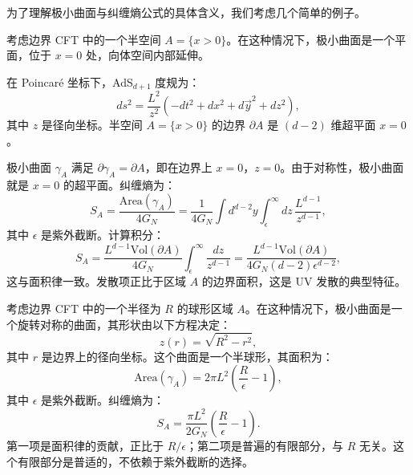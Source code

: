 为了理解极小曲面与纠缠熵公式的具体含义，我们考虑几个简单的例子。

\begin{example}[半空间的纠缠熵] \label{ex:halfspace}
考虑边界 CFT 中的一个半空间 $A = \{x > 0\}$。在这种情况下，极小曲面是一个平面，位于 $x = 0$ 处，向体空间内部延伸。

在 Poincaré 坐标下，AdS$_{d+1}$ 度规为：
\begin{equation}
    ds^2 = \frac{L^2}{z^2} \left( -dt^2 + dx^2 + d\vec{y}^2 + dz^2 \right),
\end{equation}
其中 $z$ 是径向坐标。半空间 $A = \{x > 0\}$ 的边界 $\partial A$ 是 $(d-2)$ 维超平面 $x = 0$。

极小曲面 $\gamma_A$ 满足 $\partial \gamma_A = \partial A$，即在边界上 $x = 0$，$z = 0$。由于对称性，极小曲面就是 $x = 0$ 的超平面。纠缠熵为：
\begin{equation}
    S_A = \frac{\text{Area}(\gamma_A)}{4G_N} = \frac{1}{4G_N} \int d^{d-2}y \int_\epsilon^\infty dz \, \frac{L^{d-1}}{z^{d-1}},
\end{equation}
其中 $\epsilon$ 是紫外截断。计算积分：
\begin{equation}
    S_A = \frac{L^{d-1} \text{Vol}(\partial A)}{4G_N} \int_\epsilon^\infty \frac{dz}{z^{d-1}} = \frac{L^{d-1} \text{Vol}(\partial A)}{4G_N (d-2) \epsilon^{d-2}},
\end{equation}
这与面积律一致。发散项正比于区域 $A$ 的边界面积，这是 UV 发散的典型特征。
\end{example}

\begin{example}[球形区域的纠缠熵] \label{ex:sphere}
考虑边界 CFT 中的一个半径为 $R$ 的球形区域 $A$。在这种情况下，极小曲面是一个旋转对称的曲面，其形状由以下方程决定：
\begin{equation}
    z(r) = \sqrt{R^2 - r^2},
\end{equation}
其中 $r$ 是边界上的径向坐标。这个曲面是一个半球形，其面积为：
\begin{equation}
    \text{Area}(\gamma_A) = 2\pi L^2 \left( \frac{R}{\epsilon} - 1 \right),
\end{equation}
其中 $\epsilon$ 是紫外截断。纠缠熵为：
\begin{equation}
    S_A = \frac{\pi L^2}{2G_N} \left( \frac{R}{\epsilon} - 1 \right).
\end{equation}
第一项是面积律的贡献，正比于 $R/\epsilon$；第二项是普遍的有限部分，与 $R$ 无关。这个有限部分是普适的，不依赖于紫外截断的选择。
\end{example}

